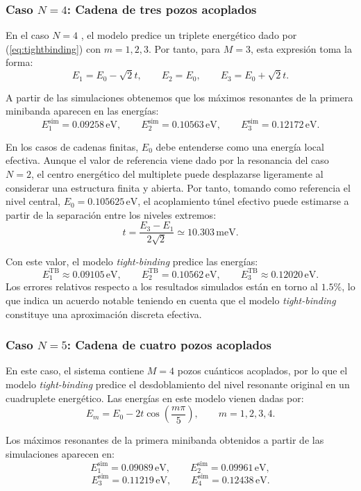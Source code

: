 \documentclass[a4paper,12pt]{article}
\begin{document}
\subsubsection{Caso $N=4$: Cadena de tres pozos acoplados}

En el caso $N=4$ , el modelo predice un triplete energético dado por (\ref{eq:tightbinding}) con $m=1, 2, 3$. Por tanto, para $M=3$, esta expresión toma la forma:
\[
E_1=E_0-\sqrt{2}t,
\qquad
E_2=E_0,
\qquad
E_3=E_0+\sqrt{2}t.
\]

A partir de las simulaciones obtenemos que los máximos resonantes de la primera minibanda aparecen en las energías:
\[
E_1^{\mathrm{sim}}=0.09258\,\mathrm{eV},
\qquad
E_2^{\mathrm{sim}}=0.10563\,\mathrm{eV},
\qquad
E_3^{\mathrm{sim}}=0.12172\,\mathrm{eV}.
\]

En los casos de cadenas finitas, $E_0$ debe entenderse como una energía local efectiva. Aunque el valor de referencia viene dado por la resonancia del caso $N=2$, el centro energético del multiplete puede desplazarse ligeramente al considerar una estructura finita y abierta. Por tanto, tomando como referencia el nivel central, $E_0=0.105625\,\mathrm{eV}$, el acoplamiento túnel efectivo puede estimarse a partir de la separación entre los niveles extremos:
\[
t=\frac{E_3-E_1}{2\sqrt{2}} \simeq 10.303\,\mathrm{meV}.
\]

Con este valor, el modelo \textit{tight-binding} predice las energías:
\[
E_1^{\mathrm{TB}}\approx 0.09105\,\mathrm{eV},
\qquad
E_2^{\mathrm{TB}}=0.10562\,\mathrm{eV},
\qquad
E_3^{\mathrm{TB}}\approx 0.12020\,\mathrm{eV}.
\]
Los errores relativos respecto a los resultados simulados están en torno al $1.5\%$, lo que indica un acuerdo notable teniendo en cuenta que el modelo \textit{tight-binding} constituye una aproximación discreta efectiva.

\subsubsection{Caso $N=5$: Cadena de cuatro pozos acoplados}
En este caso, el sistema contiene $M=4$ pozos cuánticos acoplados, por lo que el modelo \textit{tight-binding} predice el desdoblamiento del nivel resonante original en un cuadruplete energético. Las energías en este modelo vienen dadas por:
\[
E_m=E_0-2t\cos\left(\frac{m\pi}{5}\right),
\qquad m=1,2,3,4.
\]

Los máximos resonantes de la primera minibanda obtenidos a partir de las simulaciones aparecen en:
\[
E_1^{\mathrm{sim}}=0.09089\,\mathrm{eV},
\qquad
E_2^{\mathrm{sim}}=0.09961\,\mathrm{eV},
\]
\[
E_3^{\mathrm{sim}}=0.11219\,\mathrm{eV},
\qquad
E_4^{\mathrm{sim}}=0.12438\,\mathrm{eV}.
\]
\end{document}
